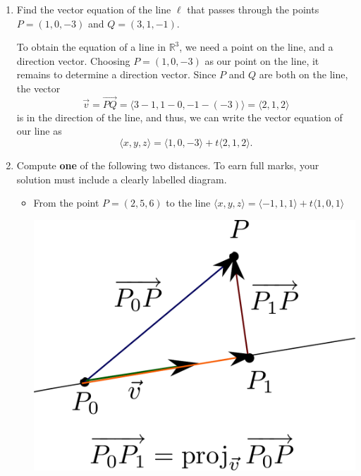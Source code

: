 \documentclass[12pt]{article}
\newcommand{\points}[1]{\marginpar{\hspace{24pt}[#1]}}
\newcommand{\R}{\mathbb{R}}
\begin{document}
\begin{enumerate}
\newpage

\item Find the vector equation of the line $\ell$ that passes through the points $P=(1,0,-3)$ and $Q=(3,1,-1)$. \points{4}

\bigskip

To obtain the equation of a line in $\R^3$, we need a point on the line, and a direction vector. Choosing $P=(1,0,-3)$ as our point on the line, it remains to determine a direction vector. Since $P$ and $Q$ are both on the line, the vector
\[
 \vec{v} = \overrightarrow{PQ} = \langle 3-1,1-0,-1-(-3)\rangle = \langle 2,1,2\rangle
\]
is in the direction of the line, and thus, we can write the vector equation of our line as
\[
 \langle x,y,z\rangle = \langle 1,0,-3\rangle + t\langle 2,1,2\rangle.
\]


\item Compute \textbf{one} of the following two distances. \points{6} To earn full marks, your solution must include a clearly labelled diagram.
\begin{itemize}
\item From the point $P=(2,5,6)$ to the line $\langle x,y,z\rangle = \langle -1,1,1\rangle + t\langle 1,0,1\rangle$  

\medskip

\begin{multicols}{2}
 \begin{center}
  \includegraphics[width=0.75\columnwidth]{WS3-3}
 \end{center}
\columnbreak


\end{multicols}
\end{itemize}
\end{enumerate}
\end{document}

